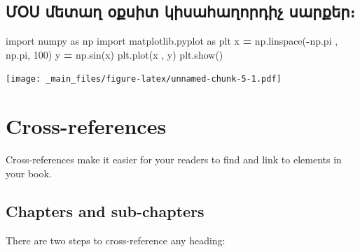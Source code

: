 \documentclass[
]{book}
\newenvironment{Shaded}{\begin{snugshade}}{\end{snugshade}}
\newcommand{\DecValTok}[1]{\textcolor[rgb]{0.00,0.00,0.81}{#1}}
\newcommand{\ImportTok}[1]{#1}
\newcommand{\NormalTok}[1]{#1}
\newcommand{\OperatorTok}[1]{\textcolor[rgb]{0.81,0.36,0.00}{\textbf{#1}}}
\begin{document}
\hypertarget{ux574ux585ux57d-ux574ux565ux57fux561ux572-ux585ux584ux57dux56bux57f-ux56fux56bux57dux561ux570ux561ux572ux578ux580ux564ux56bux579-ux57dux561ux580ux584ux565ux580}{%
\section{ՄՕՍ մետաղ օքսիտ կիսահաղորդիչ
սարքեր։}\label{ux574ux585ux57d-ux574ux565ux57fux561ux572-ux585ux584ux57dux56bux57f-ux56fux56bux57dux561ux570ux561ux572ux578ux580ux564ux56bux579-ux57dux561ux580ux584ux565ux580}}

\begin{Shaded}
\begin{Highlighting}[]
\ImportTok{import}\NormalTok{ numpy }\ImportTok{as}\NormalTok{ np}
\ImportTok{import}\NormalTok{ matplotlib.pyplot }\ImportTok{as}\NormalTok{ plt}
\NormalTok{x }\OperatorTok{=}\NormalTok{ np.linspace(}\OperatorTok{{-}}\NormalTok{np.pi , np.pi, }\DecValTok{100}\NormalTok{)}
\NormalTok{y }\OperatorTok{=}\NormalTok{ np.sin(x)}
\NormalTok{plt.plot(x , y)}
\NormalTok{plt.show()}
\end{Highlighting}
\end{Shaded}

\texttt{[image: \_main\_files/figure-latex/unnamed-chunk-5-1.pdf]}

\hypertarget{cross}{%
\chapter{Cross-references}\label{cross}}

Cross-references make it easier for your readers to find and link to
elements in your book.

\hypertarget{chapters-and-sub-chapters}{%
\section{Chapters and sub-chapters}\label{chapters-and-sub-chapters}}

There are two steps to cross-reference any heading:
\end{document}
